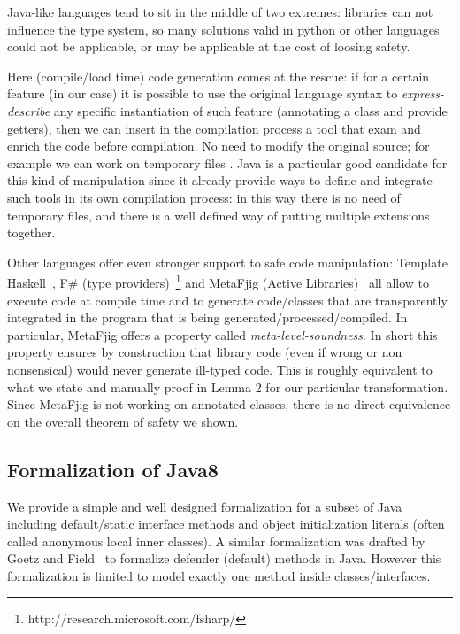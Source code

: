 Java-like languages tend to sit in the middle of two extremes: libraries
can not influence the type system, so many solutions valid in python or other
languages could not be applicable, or may be applicable at the cost of loosing
safety.

Here (compile/load time) code generation comes at the rescue: if for a certain
feature (\mixin in our case) it is possible to use the original language syntax
to \emph{express-describe} any specific instantiation of such feature
(annotating a class and provide getters), then we can insert in the compilation
process a tool that exam and enrich the code before compilation. No need to
modify the original source; for example we can work on temporary files
. Java is
a particular good candidate for this kind of manipulation since it already
provide ways to define and integrate such tools in its own compilation process:
in this way there is no need of temporary files, and there is a well defined way
of putting multiple extensions together.

Other languages offer even stronger support to safe code manipulation:
Template Haskell~\cite{sheard2002template}, F\# (type providers)~\footnote{http://research.microsoft.com/fsharp/} and MetaFjig (Active Libraries)~\cite{servetto2010metafjig}
all allow to execute code at compile time and to generate code/classes that are transparently integrated in the program that is being generated/processed/compiled.
In particular, MetaFjig offers a property called \emph{meta-level-soundness}. In short this property ensures by construction that library code (even if wrong or non nonsensical) would never generate ill-typed code. This is roughly equivalent to what we state and manually proof in Lemma 2 for our particular transformation.
Since MetaFjig is not working on annotated classes, there is no direct equivalence on the overall theorem of safety we shown.

\subsection{Formalization of Java8}
We provide a simple and well designed formalization for a subset of Java
including default/static interface methods and object initialization literals
(often called anonymous local inner classes).  A similar formalization was
drafted by Goetz and Field~\cite{goetz12fdefenders} to formalize defender
(default) methods in Java. However this formalization is limited to model
exactly one method inside classes/interfaces.

